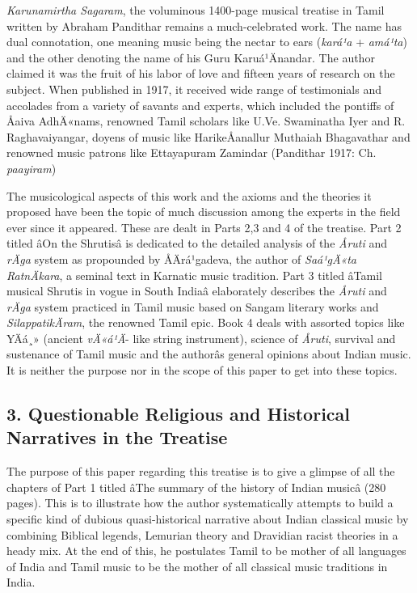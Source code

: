 \textit{Karunamirtha Sagaram}, the voluminous 1400-page musical treatise in Tamil written by Abraham Pandithar remains a much-celebrated work. The name has dual connotation, one meaning music being the nectar to ears (\textit{kará¹a} + \textit{amá¹ta}) and the other denoting the name of his Guru Karuá¹Änandar. The author claimed it was the fruit of his labor of love and fifteen years of research on the subject. When published in 1917, it received wide range of testimonials and accolades from a variety of savants and experts, which included the pontiffs of Åaiva AdhÄ«nams, renowned Tamil scholars like U.Ve. Swaminatha Iyer and R. Raghavaiyangar, doyens of music like HarikeÅanallur Muthaiah Bhagavathar and renowned music patrons like Ettayapuram Zamindar (Pandithar 1917: Ch. \textit{paayiram})

The musicological aspects of this work and the axioms and the theories it proposed have been the topic of much discussion among the experts in the field ever since it appeared. These are dealt in Parts 2,3 and 4 of the treatise. Part 2 titled âOn the Shrutisâ is dedicated to the detailed analysis of the \textit{Åruti} and \textit{rÄga} system as propounded by ÅÄrá¹gadeva, the author of \textit{Saá¹gÄ«ta RatnÄkara}, a seminal text in Karnatic music tradition. Part 3 titled âTamil musical Shrutis in vogue in South Indiaâ elaborately describes the \textit{Åruti} and \textit{rÄga} system practiced in Tamil music based on Sangam literary works and \textit{SilappatikÄram}, the renowned Tamil epic. Book 4 deals with assorted topics like YÄá¸» (ancient \textit{vÄ«á¹Ä}- like string instrument), science of \textit{Åruti}, survival and sustenance of Tamil music and the authorâs general opinions about Indian music. It is neither the purpose nor in the scope of this paper to get into these topics.

\vspace{-.2cm}

\subsection*{3. Questionable Religious and Historical Narratives in the Treatise}

The purpose of this paper regarding this treatise is to give a glimpse of all the chapters of Part 1 titled âThe summary of the history of Indian musicâ (280 pages). This is to illustrate how the author systematically attempts to build a specific kind of dubious quasi-historical narrative about Indian classical music by combining Biblical legends, Lemurian theory and Dravidian racist theories in a heady mix. At the end of this, he postulates Tamil to be mother of all languages of India and Tamil music to be the mother of all classical music traditions in India.

